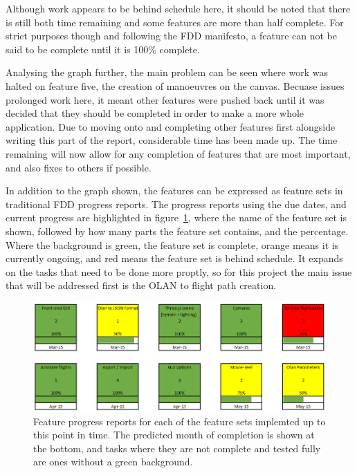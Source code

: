 Although work appears to be behind schedule here, it should be noted that there is still both time remaining and some features are more than half complete. For strict purposes though and following the FDD manifesto, a feature can not be said to be complete until it is 100\% complete. 

Analysing the graph further, the main problem can be seen where work was halted on feature five, the creation of manoeuvres on the canvas. Becuase issues prolonged work here, it meant other features were pushed back until it was decided that they should be completed in order to make a more whole application. Due to moving onto and completing other features first alongside writing this part of the report, considerable time has been made up. The time remaining will now allow for any completion of features that are most important, and also fixes to others if possible. 

In addition to the graph shown, the features can be expressed as feature sets in traditional FDD progress reports. The progress reports using the due dates, and current progress are highlighted in figure~\ref{fig:featureprogress}, where the name of the feature set is shown, followed by how many parts the feature set contains, and the percentage. Where the background is green, the feature set is complete, orange means it is currently ongoing, and red means the feature set is behind schedule. It expands on the tasks that need to be done more proptly, so for this project the main issue that will be addressed first is the OLAN to flight path creation.

\begin{figure}[h]
  \centering
      \includegraphics[width=1\textwidth]{images/featureProgress.png}
  \caption{Feature progress reports for each of the feature sets implemted up to this point in time. The predicted month of completion is shown at the bottom, and tasks where they are not complete and tested fully are ones without a green background.}
  \label{fig:featureprogress}
\end{figure}


